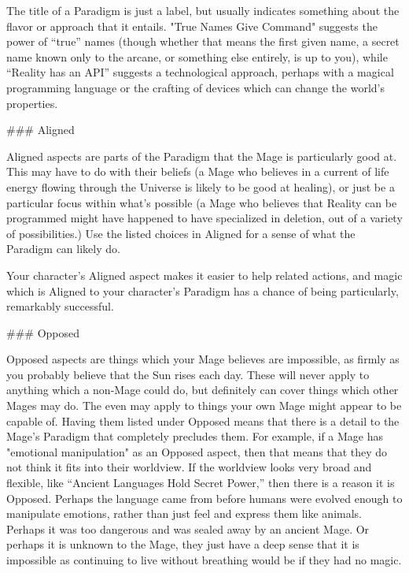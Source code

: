 \documentclass[
  oneside,
  statementpaper,
  9pt]{memoir}
\begin{document}
\begin{Player}

The title of a Paradigm is just a label, but usually indicates something about the flavor or approach that it entails. "True Names Give Command" suggests the power of “true” names (though whether that means the first given name, a secret name known only to the arcane, or something else entirely, is up to you), while “Reality has an API” suggests a technological approach, perhaps with a magical programming language or the crafting of devices which can change the world’s properties.

### Aligned

Aligned aspects are parts of the Paradigm that the Mage is particularly good at. This may have to do with their beliefs (a Mage who believes in a current of life energy flowing through the Universe is likely to be good at healing), or just be a particular focus within what’s possible (a Mage who believes that Reality can be programmed might have happened to have specialized in deletion, out of a variety of possibilities.) Use the listed choices in Aligned for a sense of what the Paradigm can likely do.

Your character’s Aligned aspect makes it easier to help related actions, and magic which is Aligned to your character’s Paradigm has a chance of being particularly, remarkably successful.

### Opposed

Opposed aspects are things which your Mage believes are impossible, as firmly as you probably believe that the Sun rises each day. These will never apply to anything which a non-Mage could do, but definitely can cover things which other Mages may do. The even may apply to things your own Mage might appear to be capable of. Having them listed under Opposed means that there is a detail to the Mage’s Paradigm that completely precludes them. For example, if a Mage has "emotional manipulation" as an Opposed aspect, then that means that they do not think it fits into their worldview. If the worldview looks very broad and flexible, like “Ancient Languages Hold Secret Power,” then there is a reason it is Opposed. Perhaps the language came from before humans were evolved enough to manipulate emotions, rather than just feel and express them like animals. Perhaps it was too dangerous and was sealed away by an ancient Mage. Or perhaps it is unknown to the Mage, they just have a deep sense that it is impossible as continuing to live without breathing would be if they had no magic.


\end{Player}
\end{document}
